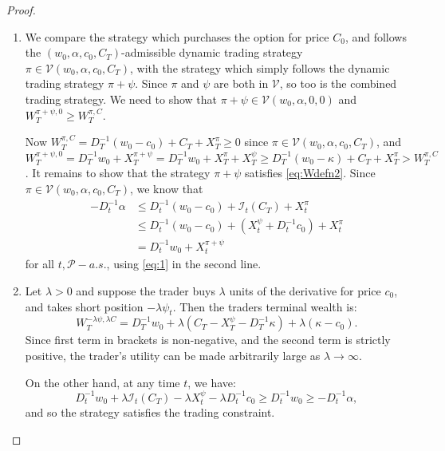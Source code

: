 \documentclass[a4paper]{amsart}
\theoremstyle{definition}
\theoremstyle{remark}
\numberwithin{equation}{section}
\newcommand{\as}{a.s.}
\newcommand{\Pc}{\mathcal{P}}
\newcommand{\Vc}{\mathcal{V}}
\newcommand{\In}{\mathcal{I}} %
\begin{document}
\begin{proof}
  \begin{enumerate}
  \item We compare the strategy which purchases the option for price $C_0$, and follows the $(w_0, \alpha, c_0,C_T)$-admissible dynamic trading strategy $\pi \in \Vc(w_0,\alpha,c_0,C_T)$, with the strategy which simply follows the dynamic trading strategy $\pi + \psi$. Since $\pi$ and $\psi$ are both in $\Vc$, so too is the combined trading strategy. We need to show that $\pi + \psi \in \Vc(w_0,\alpha,0,0)$ and $W_T^{\pi+\psi,0} \ge W_T^{\pi,C}$.

    Now $W_T^{\pi,C} = D_T^{-1}(w_0-c_0) + C_T + X_T^{\pi} \ge 0$ since $\pi \in \Vc(w_0,\alpha,c_0,C_T)$, and $W_T^{\pi+\psi,0} = D_T^{-1} w_0 + X_T^{\pi+\psi} = D_T^{-1} w_0 + X_T^{\pi} + X_T^{\psi} \ge D_T^{-1} (w_0- \kappa) + C_T + X_T^{\pi}  > W_T^{\pi,C}$. It remains to show that the strategy $\pi + \psi$ satisfies \eqref{eq:Wdefn2}. Since $\pi \in \Vc(w_0,\alpha,c_0,C_T)$, we know that
    \begin{align*}
      -D_t^{-1} \alpha
      & \le D_t^{-1}(w_0-c_0) + \In_t(C_T)  + X_t^{\pi} \\
      & \le  D_t^{-1}(w_0-c_0) + \left(X_t^\psi + D_t^{-1} c_0\right)  + X_t^{\pi}\\
       & = D_t^{-1}w_0 + X_t^{\pi+\psi} 
    \end{align*}
    for all $t, \Pc-\as{}$, using \eqref{eq:1} in the second line.


  \item Let $\lambda >0$ and suppose the trader buys $\lambda$ units of the derivative for price $c_0$, and takes short position $-\lambda \psi_t$. Then the traders terminal wealth is:
    \begin{equation*}
      W_T^{-\lambda \psi, \lambda C} = D_T^{-1} w_0 + \lambda\left( C_T - X_T^\psi - D_T^{-1} \kappa\right) + \lambda (\kappa - c_0).
    \end{equation*}
    Since first term in brackets is non-negative, and the second term is strictly positive, the trader's utility can be made arbitrarily large as $\lambda \to \infty$.

    On the other hand, at any time $t$, we have:
    \begin{equation*}
      D_t^{-1}w_0 + \lambda \In_t(C_T) - \lambda X_t^{\psi} - \lambda D_t^{-1} c_0 \ge D_t^{-1}w_0\ge -D_t^{-1} \alpha,
    \end{equation*}
    and so the strategy satisfies the trading constraint.
  \end{enumerate}
\end{proof}
\end{document}
